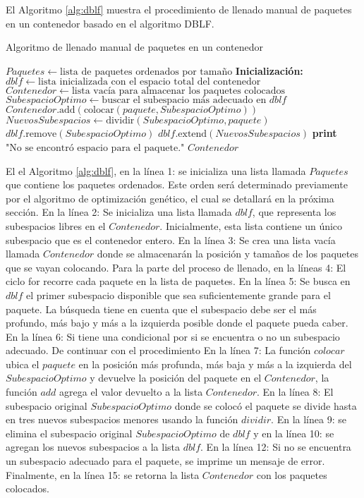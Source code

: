 El Algoritmo \ref{alg:dblf} muestra el procedimiento de llenado manual de paquetes en un contenedor basado en el algoritmo DBLF.

\begin{algorithm}[H]
    \caption{Algoritmo de llenado manual de paquetes en un contenedor}
    \label{alg:dblf}
    \begin{algorithmic}[1]
        \State $Paquetes \gets \text{lista de paquetes ordenados por tamaño}$
        \State \textbf{Inicialización:} $dblf \gets \text{lista inicializada con el espacio total del contenedor}$
        \State $Contenedor \gets \text{lista vacía para almacenar los paquetes colocados}$
        \State $SubespacioOptimo \gets \text{buscar el subespacio más adecuado en } dblf$
        \State $Contenedor.\text{add}( \text{colocar}(paquete, SubespacioOptimo) )$
        \State $NuevosSubespacios \gets \text{dividir}(SubespacioOptimo, paquete)$
        \State $dblf.\text{remove}(SubespacioOptimo)$
        \State $dblf.\text{extend}(NuevosSubespacios)$
        \Else
        \State \textbf{print} $\text{"No se encontró espacio para el paquete."}$
        \EndIf
        \EndFor
        \State \Return $Contenedor$
    \end{algorithmic}
\end{algorithm}

El el Algoritmo \ref{alg:dblf}, en la línea 1: se inicializa una lista llamada $Paquetes$ que contiene los paquetes ordenados. Este orden será determinado previamente por el algoritmo de optimización genético, el cual se detallará en la próxima sección. En la línea 2: Se inicializa una lista llamada $dblf$, que representa los subespacios libres en el $Contenedor$. Inicialmente, esta lista contiene un único subespacio que es el contenedor entero. En la línea 3: Se crea una lista vacía llamada $Contenedor$ donde se almacenarán la posición y tamaños de los paquetes que se vayan colocando. Para la parte del proceso de llenado, en la líneas 4: El ciclo for recorre cada paquete en la lista de paquetes.
En la línea 5: Se busca en $dblf$ el primer subespacio disponible que sea suficientemente grande para el paquete. La búsqueda tiene en cuenta que el subespacio debe ser el más profundo, más bajo y más a la izquierda posible donde el paquete pueda caber. En la línea 6: Si tiene una condicional por si se encuentra o no un subespacio adecuado. De continuar con el procedimiento En la línea 7: La función $colocar$ ubica el $paquete$ en la posición más profunda, más baja y más a la izquierda del $SubespacioOptimo$ y devuelve la posición del paquete en el $Contenedor$, la función $add$ agrega el valor devuelto a la lista $Contenedor$. En la línea 8: El subespacio original $SubespacioOptimo$ donde se colocó el paquete se divide hasta en tres nuevos subespacios menores usando la función $dividir$. En la línea 9: se elimina el subespacio original $SubespacioOptimo$ de $dblf$ y en la línea 10: se agregan los nuevos subespacios a la lista $dblf$. En la línea 12: Si no se encuentra un subespacio adecuado para el paquete, se imprime un mensaje de error. Finalmente, en la línea 15: se retorna la lista $Contenedor$ con los paquetes colocados.

